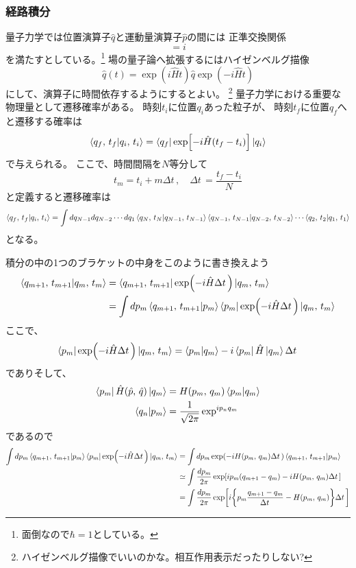 \documentclass[../../master.tex]{subfiles}
\begin{document}
\subsubsection*{経路積分}
量子力学では位置演算子\(\hat{q}\)と運動量演算子\(\hat{p}\)の間には
正準交換関係
\begin{equation}
    [\hat{q},\,\hat{p}] = i
\end{equation}
を満たすとしている。\footnote{面倒なので\(\hbar=1\)としている。}
場の量子論へ拡張するにはハイゼンベルグ描像
\begin{equation}
    \hat{q}(t) = \exp(i\hat{H}t)\hat{q}\exp(-i\hat{H}t)
\end{equation}
にして、演算子に時間依存するようにするとよい。
\footnote{ハイゼンベルグ描像でいいのかな。相互作用表示だったりしない?}
\setcounter{equation}{20}
量子力学における重要な物理量として遷移確率がある。
時刻\(t_i\)に位置\(q_i\)あった粒子が、
時刻\(t_f\)に位置\(q_f\)へと遷移する確率は
\begin{equation}
    \braket{q_f,\,t_f}{q_i,\,t_i} = \bra{q_f}\exp[-i\hat{H}(t_f-t_i)]\ket{q_i}
\end{equation}
で与えられる。
ここで、時間間隔を\(N\)等分して
\begin{equation}
    t_m = t_i + m\Delta t\,,\quad \Delta t\, = \frac{t_f-t_i}{N}
\end{equation}
と定義すると遷移確率は
\begin{equation}
    \braket{q_f,\,t_f}{q_i,\,t_i} = \int dq_{N-1}dq_{N-2}\cdots dq_1
    \braket{q_N,\,t_N}{q_{N-1},\,t_{N-1}}
    \braket{q_{N-1},\,t_{N-1}}{q_{N-2},\,t_{N-2}}
    \cdots
    \braket{q_2,\,t_2}{q_{1},\,t_{1}}
\end{equation}
となる。

積分の中の1つのブラケットの中身をこのように書き換えよう
\begin{align}
    \braket{q_{m+1},\,t_{m+1}}{q_{m},\,t_{m}}
    &= \bra{q_{m+1},\,t_{m+1}}\exp(-i\hat{H}\Delta t\,)\ket{q_{m},\,t_{m}} \notag\\
    &= \int dp_m \braket{q_{m+1},\,t_{m+1}}{p_m}\bra{p_m}\exp(-i\hat{H}\Delta t\,)\ket{q_{m},\,t_{m}}
\end{align}
ここで、
\begin{equation}
    \bra{p_m}\exp(-i\hat{H}\Delta t\,)\ket{q_{m},\,t_{m}}
    = \braket{p_m}{q_m}-i\bra{p_m}\hat{H}\ket{q_m}\Delta t\,
\end{equation}
でありそして、
\begin{align}
    \bra{p_m}\hat{H}(\hat{p},\,\hat{q})\ket{q_m} &= H(p_m,\,q_m)\braket{p_m}{q_m}\\
    \braket{q_n}{p_m} &= \frac{1}{\sqrt{2\pi}}\exp^{ip_n q_m} \notag
\end{align}
であるので
\begin{align}
    \int dp_m \braket{q_{m+1},\,t_{m+1}}{p_m}\bra{p_m}\exp(-i\hat{H}\Delta t\,)\ket{q_{m},\,t_{m}}
    &=\int dp_m \exp(-iH(p_m,\,q_m)\Delta t\,)\braket{q_{m+1},\,t_{m+1}}{p_m} \notag\\
    &\simeq \int \frac{dp_m}{2\pi}\exp[ip_m(q_{m+1}-q_m)-iH(p_m,\,q_m)\Delta t\,]\\
    &= \int \frac{dp_m}{2\pi}\exp[i\qty{p_m\frac{q_{m+1}-q_m}{\Delta t\,}-H(p_m,\,q_m)}\Delta t\,] \notag
\end{align}
\end{document}
